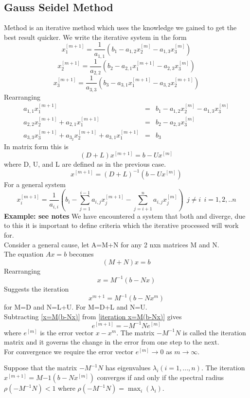 \subsection{Gauss Seidel Method}
 Method is an iterative method which uses the knowledge we gained to get the best result quicker.
We write the iterative system in the form
\[x_1^{[m+1]} = \frac{1}{a_{1,1}}(b_1 - a_{1,2}x_2^{[m]} -a_{1,3}x_3^{[m]}) \]
\[x_2^{[m+1]} = \frac{1}{a_{2,2}}(b_2 - a_{2,1}x_1^{[m+1]} -a_{2,3}x_3^{[m]}) \]
\[x_3^{[m+1]} = \frac{1}{a_{3,3}}(b_3 - a_{3,1}x_1^{[m+1]} -a_{3,2}x_2^{[m+1]}) \]
Rearranging 
\begin{eqnarray}
a_{1,1} x_1^{[m+1]} &=& b_1 - a_{1,2}x_2^{[m]} -a_{1,3}x_3^{[m]} \\
a_{2,2} x_2^{[m+1]} + a_{2,1}x_1^{[m+1]} &=& b_2 -a_{2,3}x_3^{[m]} \\
a_{3,3} x_3^{[m+1]} +a_{3_2}x_2^{[m+1]}+a_{3,1}x_{1}^{[m+1]}&=& b_3 
\end{eqnarray}
In matrix form this is 
\[ (D+L)x^{[m+1]} = b - Ux^{[m]} \]
where D, U, and L are defined as in the previous case.
\[ x^{[m+1]} = (D+L)^{-1}(b - Ux^{[m]}) \]
For a general system
\[ x_i^{[m+1]}=\frac{1}{a_{i,i}}(b_i-\sum_{j=1}^{i-1}a_{i,j}x_{j}^{[m+1]}-\sum_{j=i+1}^{n}a_{i,j}x_{j}^{[m]}
) \ \ j\not=i \ \ i = 1,2,..n\]
\textbf{Example: see notes}
We have encountered a system that both  and  diverge, due to this it is 
important to define criteria which the iterative processed will work for.\\
Consider a general cause, let A=M+N for any 2 nxn matrices M and N.\\
The equation $Ax=b$ becomes
\begin{equation}
(M+N)x=b
\label{M+N}
\end{equation}
Rearranging 
\begin{equation}
x=M^{-1}(b-Nx)
\label{x=M(b-Nx)}
\end{equation}
Suggests the iteration
\begin{equation}
x^{m+1}=M^{-1}(b-Nx^m)
\label{iteration x=M(b-Nx)}
\end{equation}
for  M=D and N=L+U. For  M=D+L and N=U.\\
Subtracting \ref{x=M(b-Nx)} from  \ref{iteration x=M(b-Nx)} gives
\begin{equation}
e^{[m+1]}=-M^{-1}Ne^{[m]}
\label{error x=M(b-Nx)}
\end{equation}
where $e^{[m]}$ is the error vector $x-x^{m}$. The matrix $-M^{-1}N$ is called the iteration matrix and it governs the change in the error from one step to the next.\\
For convergence we require the error vector $e^{[m]} \rightarrow 0$ as $m \rightarrow \infty$.
\begin{theorem}
\label{spectral}
Suppose that the matrix $-M^{-1}N$ has eigenvalues $\lambda_i (i=1,...,n)$.  The iteration
$x^{[m+1]}=M{-1}(b-Nx^{[m]})$ converges if and only if the spectral radius 
$\rho(-M^{-1}N) < 1$ where 
$\rho(-M^{-1}N) =\max_{i}(\lambda_i)$.
\end{theorem}

